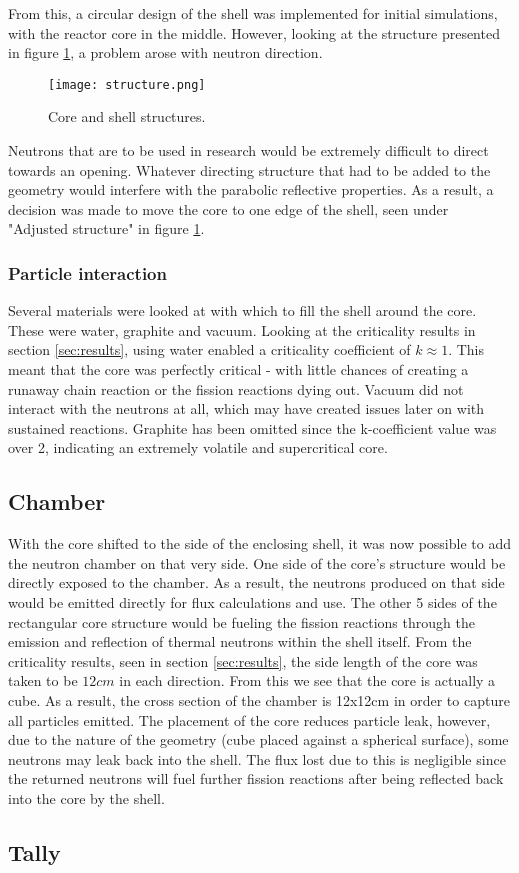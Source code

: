 From this, a circular design of the shell was implemented for initial simulations, with the reactor core in the middle. However, looking at the structure presented in figure \ref{fig:structure}, a problem arose with neutron direction.

\begin{figure}[!htbp]
\caption{Core and shell structures.}
\label{fig:structure}
\centering
\texttt{[image: structure.png]}
\end{figure}

Neutrons that are to be used in research would be extremely difficult to direct towards an opening. Whatever directing structure that had to be added to the geometry would interfere with the parabolic reflective properties. As a result, a decision was made to move the core to one edge of the shell, seen under "Adjusted structure" in figure \ref{fig:structure}.

\subsubsection{Particle interaction}

Several materials were looked at with which to fill the shell around the core. These were water, graphite and vacuum. Looking at the criticality results in section \ref{sec:results}, using water enabled a criticality coefficient of $k\approx 1$. This meant that the core was perfectly critical - with little chances of creating a runaway chain reaction or the fission reactions dying out. Vacuum did not interact with the neutrons at all, which may have created issues later on with sustained reactions. Graphite has been omitted since the k-coefficient value was over 2, indicating an extremely volatile and supercritical core.
\subsection{Chamber}

With the core shifted to the side of the enclosing shell, it was now possible to add the neutron chamber on that very side. One side of the core's structure would be directly exposed to the chamber. As a result, the neutrons produced on that side would be emitted directly for flux calculations and use. The other 5 sides of the rectangular core structure would be fueling the fission reactions through the emission and reflection of thermal neutrons within the shell itself. From the criticality results, seen in section \ref{sec:results}, the side length of the core was taken to be $12cm$ in each direction. From this we see that the core is actually a cube. As a result, the cross section of the chamber is 12x12cm in order to capture all particles emitted. The placement of the core reduces particle leak, however, due to the nature of the geometry (cube placed against a spherical surface), some neutrons may leak back into the shell. The flux lost due to this is negligible since the returned neutrons will fuel further fission reactions after being reflected back into the core by the shell.
\subsection{Tally}